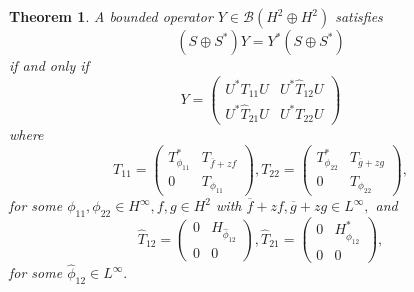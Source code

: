 \documentclass[12pt, reqno]{amsart}
\newtheorem{theorem}{Theorem}[section]
\theoremstyle{definition}
\theoremstyle{remark}
\numberwithin{equation}{section}
\begin{document}
        \begin{theorem}\label{skew is S+S*}
           A bounded operator $Y\in \mathcal{B}(H^2\oplus H^2)$ 
           satisfies
           \begin{equation*}
               (S\oplus S^*)Y=Y^*(S\oplus S^*)
           \end{equation*}
           if and only if 
           \begin{equation}\label{converse skew}
               Y=
               \begin{pmatrix}
                   U^*T_{11}U& U^*\hat{T}_{12}U\\
                   U^*{\hat{T}_{21}}U& U^*T_{22}U
               \end{pmatrix}
           \end{equation}
           where 
           $$T_{11}=
             \begin{pmatrix}
                 T^*_{\phi_{11}}&T_{\overline{f}+zf}\\
                 0&T_{\phi_{11}}
             \end{pmatrix},
             T_{22}=
             \begin{pmatrix}
                T^*_{\phi_{22}}&T_{\overline{g}+zg}\\
                 0&T_{\phi_{22}}
             \end{pmatrix},
             $$
                for some $\phi_{11}, \phi_{22} \in H^\infty, f, g \in H^2$ with ${\overline{f}+zf}, {\overline{g}+zg} \in L^\infty,$ and
             $$
                \hat{T}_{12}=
                \begin{pmatrix}
                0&H_{\hat{\phi}_{12}}\\
                0&0
                \end{pmatrix},
                \hat{T}_{21}=
                \begin{pmatrix}
                0&H^*_{\hat{\phi}_{12}}\\
                0&0
                \end{pmatrix},
            $$
             for some ${\hat{\phi}_{12}} \in L^\infty.$
        \end{theorem}
\end{document}
